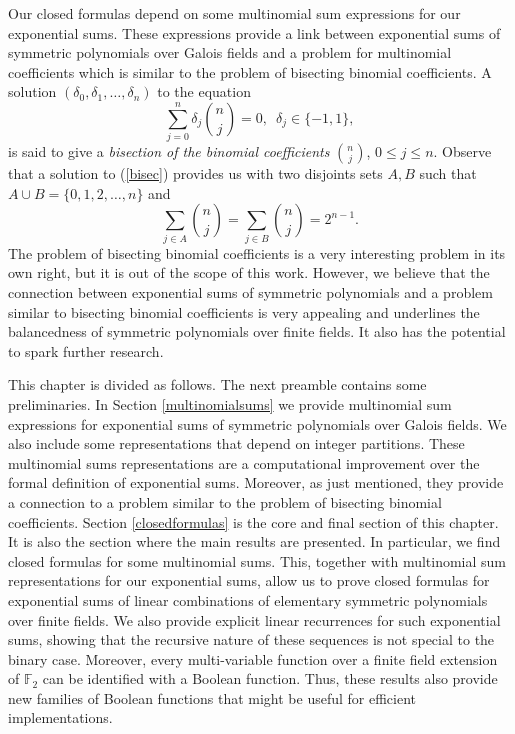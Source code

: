 Our closed formulas depend on some multinomial sum expressions for our exponential sums.  These expressions provide a link between exponential sums of symmetric polynomials over Galois fields and a problem for multinomial 
coefficients which is similar to the problem of bisecting binomial coefficients.  A solution $(\delta_0,\delta_1,\ldots, \delta_n)$ to the equation
\begin{equation}
 \sum_{j=0}^n \delta_j \binom{n}{j}=0,\,\,\, \delta_j \in \{-1,1\},
\end{equation}
is said to give a {\em bisection of the binomial coefficients} $\binom{n}{j}$, $0\leq j \leq n.$  Observe that a solution to (\ref{bisec}) provides us with two disjoints sets $A,B$ such that 
$A\cup B =\{0,1,2,\ldots,n\}$ and
\begin{equation}
 \sum_{j \in A} \binom{n}{j}=\sum_{j\in B}\binom{n}{j}=2^{n-1}.
\end{equation}
The problem of bisecting binomial coefficients is a very interesting problem in its own right, but it is out of the scope of this work.  However, we believe that the connection between exponential
sums of symmetric polynomials and a problem similar to bisecting binomial coefficients is very appealing and underlines the balancedness of symmetric polynomials over finite fields.  It also has
the potential to spark further research.

This chapter is divided as follows. The next preamble contains some preliminaries.  In Section \ref{multinomialsums} we provide multinomial sum expressions for exponential sums of symmetric polynomials
over Galois fields.  We also include some representations that depend on integer partitions.  These multinomial sums representations are a computational improvement over the formal definition of
exponential sums.  Moreover, as just mentioned, they provide a connection to a problem similar to the problem of bisecting binomial coefficients.  Section \ref{closedformulas} is the core and final section 
of this chapter.  It is also the section where the main results are presented.  In particular, we find closed formulas for some multinomial sums.  This, together with multinomial sum representations
for our exponential sums, allow us to prove closed formulas for exponential sums of linear combinations of elementary symmetric polynomials over finite fields. We also provide explicit linear recurrences  for such exponential sums, showing
that the recursive nature of these sequences is not special to the binary case.  Moreover, every multi-variable function over a finite field extension of $\mathbb{F}_2$ can be identified with a Boolean 
function.  Thus, these results also provide new families of Boolean functions that might be useful for efficient implementations.




